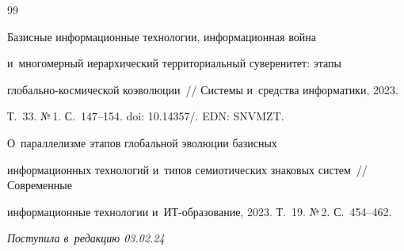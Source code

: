 {{\begin{thebibliography}{99}


 Базисные информационные технологии, информационная война 


и~многомерный иерархический территориальный суверенитет: этапы  


гло\-баль\-но-кос\-ми\-че\-ской коэволюции~/\!\!/ Системы и~средства информатики, 2023. 


Т.~33. №\,1. С.~147--154. doi: 10.14357\!/. EDN: SNVMZT.







 О~параллелизме этапов глобальной эволюции базисных 


информационных технологий и~типов семиотических знаковых сис\-тем~/\!\!/ Современные 


информационные технологии и~ИТ-обра\-зо\-ва\-ние, 2023. Т.~19. №\,2. С.~454--462.





   \end{thebibliography}


} }











\vspace*{-6pt}





\hfill{\small\textit{Поступила в~редакцию 03.02.24}}





\vspace*{8pt}




























